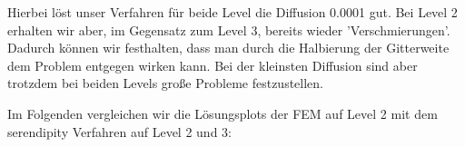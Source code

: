 Hierbei löst unser Verfahren für beide Level die Diffusion 0.0001 gut. Bei Level 2 erhalten wir aber, im Gegensatz zum Level 3, bereits wieder 'Verschmierungen'. Dadurch können wir festhalten, dass man durch die Halbierung der Gitterweite dem Problem entgegen wirken kann. Bei der kleinsten Diffusion sind aber trotzdem bei beiden Levels große Probleme festzustellen.

Im Folgenden vergleichen wir die Lösungsplots der FEM auf Level 2 mit dem serendipity Verfahren auf Level 2 und 3:
 
\begin{figure}[H]
	\centering
\end{figure}

